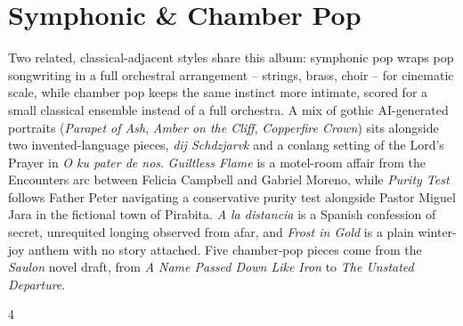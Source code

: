 \documentclass[a4paper,landscape]{memoir}
\begin{document}
\chapter{Symphonic \& Chamber Pop}
Two related, classical-adjacent styles share this album: symphonic pop wraps pop songwriting in a full orchestral arrangement -- strings, brass, choir -- for cinematic scale, while chamber pop keeps the same instinct more intimate, scored for a small classical ensemble instead of a full orchestra. A mix of gothic AI-generated portraits (\emph{Parapet of Ash}, \emph{Amber on the Cliff}, \emph{Copperfire Crown}) sits alongside two invented-language pieces, \emph{dij Schdzjarvk} and a conlang setting of the Lord's Prayer in \emph{O ku pater de nos}. \emph{Guiltless Flame} is a motel-room affair from the Encounters arc between Felicia Campbell and Gabriel Moreno, while \emph{Purity Test} follows Father Peter navigating a conservative purity test alongside Pastor Miguel Jara in the fictional town of Pirabita. \emph{A la distancia} is a Spanish confession of secret, unrequited longing observed from afar, and \emph{Frost in Gold} is a plain winter-joy anthem with no story attached. Five chamber-pop pieces come from the \emph{Saulon} novel draft, from \emph{A Name Passed Down Like Iron} to \emph{The Unstated Departure}.
\clearpage\begin{multicols*}{4}
\end{multicols*}
\end{document}
